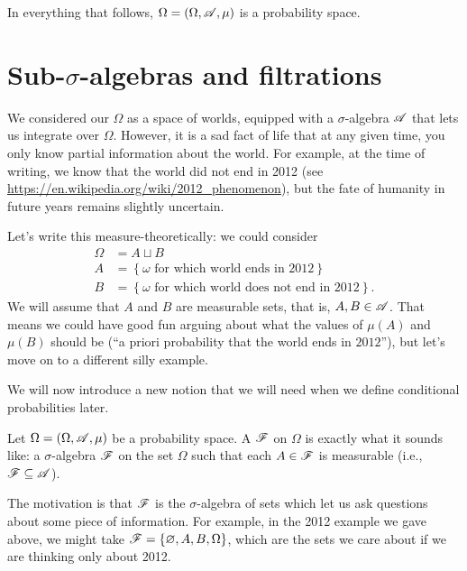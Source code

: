 In everything that follows, $\Omega = (\Omega, \mathscr A, \mu)$ is a probability space.

\section{Sub-$\sigma$-algebras and filtrations}
We considered our $\Omega$ as a space of worlds,
equipped with a $\sigma$-algebra $\mathscr A$ that lets us integrate over $\Omega$.
However, it is a sad fact of life that at any given time,
you only know partial information about the world.
For example, at the time of writing,
we know that the world did not end in 2012
(see \url{https://en.wikipedia.org/wiki/2012_phenomenon}),
but the fate of humanity in future years remains slightly uncertain.

Let's write this measure-theoretically: we could consider
\begin{align*}
	\Omega &= A \sqcup B \\
	A &= \left\{ \omega \text{ for which world ends in $2012$} \right\} \\
	B &= \left\{ \omega \text{ for which world does not end in $2012$} \right\}.
\end{align*}
We will assume that $A$ and $B$ are measurable sets,
that is, $A,B \in \mathscr A$.
That means we could have good fun arguing about what the values
of $\mu(A)$ and $\mu(B)$ should be
(``a priori probability that the world ends in $2012$''),
but let's move on to a different silly example.


We will now introduce a new notion that
we will need when we define conditional probabilities later.
\begin{definition}
	Let $\Omega = (\Omega, \mathscr A, \mu)$ be a probability space.
	A  $\mathscr F$
	on $\Omega$ is exactly what it sounds like:
	a $\sigma$-algebra $\mathscr F$ on the set $\Omega$
	such that each $A \in \mathscr F$ is measurable
	(i.e.,\ $\mathscr F \subseteq \mathscr A$).
\end{definition}

The motivation is that $\mathscr F$ is the $\sigma$-algebra of sets
which let us ask questions about some piece of information.
For example, in the 2012 example we gave above,
we might take $\mathscr F = \{\varnothing, A, B, \Omega\}$,
which are the sets we care about if we are thinking only about 2012.

